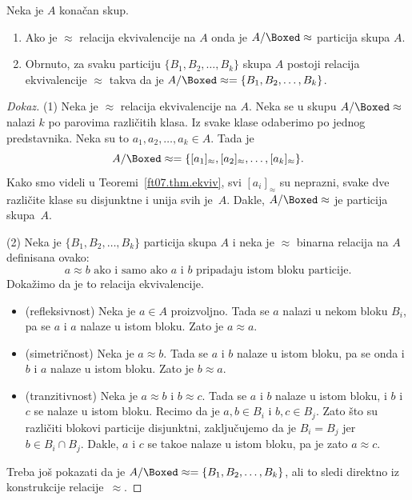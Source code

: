\begin{THM}
  Neka je $A$ kona\v can skup.
  \begin{enumerate}
  \item Ako je $\approx$ relacija ekvivalencije na $A$ onda je $A / \Boxed\approx$ particija skupa $A$.
  \item Obrnuto, za svaku particiju $\{B_1, B_2, \ldots, B_k\}$ skupa $A$ postoji relacija ekvivalencije $\approx$ takva da je
  $A / \Boxed\approx = \{B_1, B_2, \ldots, B_k\}$.
  \end{enumerate}
\end{THM}
\begin{proof}[Dokaz]
  (1)
  Neka je $\approx$ relacija ekvivalencije na $A$. Neka se u skupu $A / \Boxed\approx$ nalazi $k$ po parovima
  razli\v citih klasa. Iz svake klase odaberimo po jednog predstavnika. Neka su to $a_1, a_2, \ldots, a_k \in A$.
  Tada je
  $$
    A / \Boxed\approx = \{[a_1]_\approx, [a_2]_\approx, \ldots, [a_k]_\approx\}.
  $$
  Kako smo videli u Teoremi~\ref{ft07.thm.ekviv}, svi $[a_i]_\approx$ su neprazni, svake dve razli\v cite klase su disjunktne
  i unija svih je~$A$. Dakle, $A / \Boxed\approx$ je particija skupa~$A$.
  
  \medskip
  
  (2)
  Neka je $\{B_1, B_2, \ldots, B_k\}$ particija skupa $A$ i neka je $\approx$ binarna relacija na $A$ definisana ovako:
  $$
    a \approx b \text{\ \ ako i samo ako $a$ i $b$ pripadaju istom bloku particije.}
  $$
  Doka\v zimo da je to relacija ekvivalencije.
  \begin{itemize}
  \item
    (refleksivnost)
    Neka je $a \in A$ proizvoljno. Tada se $a$ nalazi u nekom bloku $B_i$, pa se $a$ i $a$ nalaze u istom bloku.
    Zato je $a \approx a$.
  \item
    (simetri\v cnost)
    Neka je $a \approx b$. Tada se $a$ i $b$ nalaze u istom bloku, pa se onda i $b$ i $a$ nalaze u istom bloku.
    Zato je $b \approx a$.
  \item
    (tranzitivnost)
    Neka je $a \approx b$ i $b \approx c$. Tada se $a$ i $b$ nalaze u istom bloku, i $b$ i $c$ se nalaze u istom bloku.
    Recimo da je $a, b \in B_i$ i $b, c \in B_j$. Zato \v sto su razli\v citi blokovi particije disjunktni, zaklju\v cujemo
    da je $B_i = B_j$ jer $b \in B_i \cap B_j$. Dakle, $a$ i $c$ se tako\dj e nalaze u istom bloku, pa je zato $a \approx c$.
  \end{itemize}
  Treba jo\v s pokazati da je $A / \Boxed\approx = \{B_1, B_2, \ldots, B_k\}$, ali to sledi direktno iz konstrukcije relacije~$\approx$.
\end{proof}

